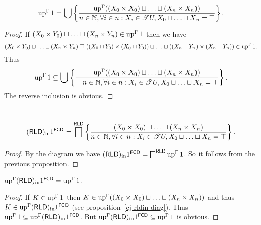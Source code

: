 \begin{prop}
  ~
  \[ \operatorname{up}^{\Gamma} 1 = \bigcup \left\{ \frac{ \operatorname{up}^{\Gamma} ((X_0 \times
     X_0) \sqcup \ldots \sqcup (X_n \times X_n)) }{ n
     \in \mathbb{N}, \forall i \in n : X_i \in \mathscr{T} U, X_0 \sqcup
     \ldots \sqcup X_n = \top }\right\} . \]
\end{prop}

\begin{proof}
  If $(X_0 \times Y_0) \sqcup \ldots \sqcup (X_n \times Y_n) \in
  \operatorname{up}^{\Gamma} 1$ then we have
  \[ (X_0 \times Y_0) \sqcup \ldots \sqcup (X_n \times Y_n) \sqsupseteq ((X_0
     \sqcap Y_0) \times (X_0 \sqcap Y_0)) \sqcup \ldots \sqcup ((X_n \sqcap
     Y_n) \times (X_n \sqcap Y_n)) \in \operatorname{up}^{\Gamma} 1. \]
  Thus
  \[ \operatorname{up}^{\Gamma} 1 \subseteq \bigcup \left\{ \frac{ \operatorname{up}^{\Gamma} ((X_0
     \times X_0) \sqcup \ldots \sqcup (X_n \times X_n)) }{
     \hspace{1em} n \in \mathbb{N}, \forall i \in n : X_i \in \mathscr{T} U,
     X_0 \sqcup \ldots \sqcup X_n = \top }\right\} . \]
  The reverse inclusion is obvious.
\end{proof}

\begin{prop}
  ~
  \[ (\mathsf{RLD})_{\mathrm{in}} 1^{\mathsf{FCD}} =
     \bigsqcap^{\mathsf{RLD}} \left\{ \frac{ (X_0 \times X_0) \sqcup \ldots
     \sqcup (X_n \times X_n) }{ n \in \mathbb{N},
     \forall i \in n : X_i \in \mathscr{T} U, X_0 \sqcup \ldots \sqcup X_n =
     \top }\right\} . \]
\end{prop}

\begin{proof}
  By the diagram we have $(\mathsf{RLD})_{\mathrm{in}}
  1^{\mathsf{FCD}} = \bigsqcap^{\mathsf{RLD}} \operatorname{up}^{\Gamma} 1$. So it follows from the previous proposition.
\end{proof}

\begin{prop}
  $\operatorname{up}^{\Gamma} (\mathsf{RLD})_{\mathrm{in}} 1^{\mathsf{FCD}} = \operatorname{up}^{\Gamma} 1$.
\end{prop}

\begin{proof}
  If $K \in \operatorname{up}^{\Gamma} 1$ then $K \in \operatorname{up}^{\Gamma} ((X_0 \times
  X_0) \sqcup \ldots \sqcup (X_n \times X_n))$ and thus $K \in
  \operatorname{up}^{\Gamma}  (\mathsf{RLD})_{\mathrm{in}}
  1^{\mathsf{FCD}}$ (see proposition~\ref{cj-rldin-diag}). Thus $\operatorname{up}^{\Gamma}
  1 \subseteq \operatorname{up}^{\Gamma}  (\mathsf{RLD})_{\mathrm{in}}
  1^{\mathsf{FCD}}$. But $\operatorname{up}^{\Gamma} 
  (\mathsf{RLD})_{\mathrm{in}} 1^{\mathsf{FCD}} \subseteq
  \operatorname{up}^{\Gamma} 1$ is obvious.
\end{proof}